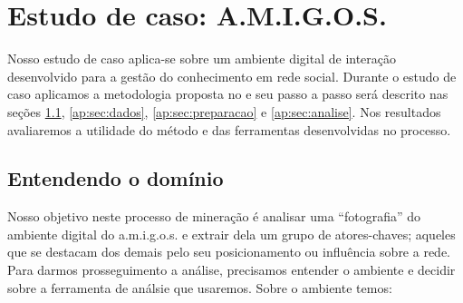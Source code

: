 \chapter{Estudo de caso: A.M.I.G.O.S.}
\label{ap:estudo}

Nosso estudo de caso aplica-se sobre um ambiente digital de interação
desenvolvido para a gestão do conhecimento em rede social. Durante o estudo de
caso aplicamos a metodologia proposta no  e seu passo a passo
será descrito nas seções \ref{ap:sec:dominio}, \ref{ap:sec:dados},
\ref{ap:sec:preparacao} e \ref{ap:sec:analise}. Nos resultados avaliaremos a
utilidade do método e das ferramentas desenvolvidas no processo.

\section{Entendendo o domínio}
\label{ap:sec:dominio}

Nosso objetivo neste processo de mineração é analisar uma ``fotografia'' do
ambiente digital do a.m.i.g.o.s. e extrair dela um grupo de atores-chaves;
aqueles que se destacam dos demais pelo seu posicionamento ou influência sobre a 
rede. Para darmos prosseguimento a análise, precisamos entender o ambiente e
decidir sobre a ferramenta de análsie que usaremos. Sobre o ambiente temos:

